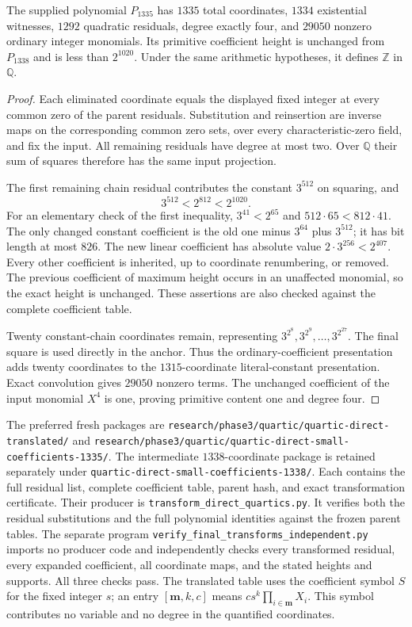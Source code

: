 \begin{theorem}
\label{thm:p3-small-coefficient-1335}
The supplied polynomial $P_{1335}$ has $1335$ total coordinates,
$1334$ existential witnesses, $1292$ quadratic residuals, degree
exactly four, and $29050$ nonzero ordinary integer monomials.
Its primitive coefficient height is unchanged from $P_{1338}$ and
is less than $2^{1020}$.  Under the same arithmetic hypotheses,
it defines $\mathbb Z$ in $\mathbb Q$.
\end{theorem}
\begin{proof}
Each eliminated coordinate equals the displayed fixed integer
at every common zero of the parent residuals.  Substitution and
reinsertion are inverse maps on the corresponding common zero
sets, over every characteristic-zero field, and fix the input.
All remaining residuals have degree at most two.  Over $\mathbb Q$
their sum of squares therefore has the same input projection.

The first remaining chain residual contributes the constant
$3^{512}$ on squaring, and
\[
                             3^{512}<2^{812}<2^{1020}.
\]
For an elementary check of the first inequality, $3^{41}<2^{65}$
and $512\cdot65<812\cdot41$.  The only changed constant
coefficient is the old one minus $3^{64}$ plus $3^{512}$; it
has bit length at most $826$.  The new linear coefficient has
absolute value $2\cdot3^{256}<2^{407}$.  Every other coefficient
is inherited, up to coordinate renumbering, or removed.  The
previous coefficient of maximum height occurs in an unaffected
monomial, so the exact height is unchanged.  These assertions
are also checked against the complete coefficient table.

Twenty constant-chain coordinates remain, representing
$3^{2^8},3^{2^9},\ldots,3^{2^{27}}$.  The final square is
used directly in the anchor.  Thus the ordinary-coefficient
presentation adds twenty coordinates to the $1315$-coordinate
literal-constant presentation.  Exact convolution gives $29050$
nonzero terms.  The unchanged coefficient of the input monomial
$X^4$ is one, proving primitive content one and degree four.
\end{proof}

The preferred fresh packages are
\nolinkurl{research/phase3/quartic/quartic-direct-translated/} and
\nolinkurl{research/phase3/quartic/quartic-direct-small-coefficients-1335/}.
The intermediate $1338$-coordinate package is retained separately
under \nolinkurl{quartic-direct-small-coefficients-1338/}.
Each contains the full residual list, complete coefficient table,
parent hash, and exact transformation certificate.  Their producer
is \nolinkurl{transform_direct_quartics.py}.  It verifies both the
residual substitutions and the full polynomial identities against
the frozen parent tables.  The separate program
\nolinkurl{verify_final_transforms_independent.py} imports no producer
code and independently checks every transformed residual, every
expanded coefficient, all coordinate maps, and the stated heights
and supports.  All three checks pass.  The translated table uses
the coefficient symbol $S$ for the fixed integer $s$; an entry
$[\mathbf m,k,c]$ means $cs^k\prod_{i\in\mathbf m}X_i$.
This symbol contributes no variable and no degree in the quantified
coordinates.
